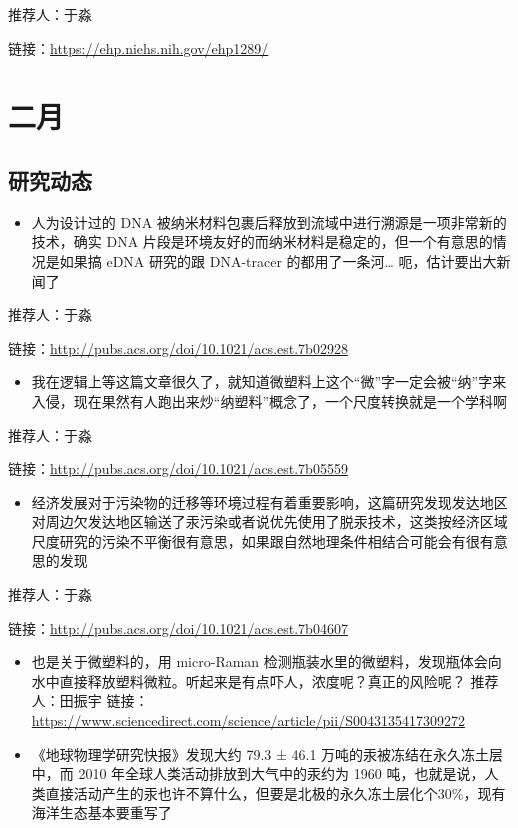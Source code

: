 \documentclass[
]{book}
\providecommand{\tightlist}{%
  \setlength{\itemsep}{0pt}\setlength{\parskip}{0pt}}
\begin{document}
推荐人：于淼

链接：\url{https://ehp.niehs.nih.gov/ehp1289/}

\hypertarget{ux4e8cux6708}{%
\section*{二月}\label{ux4e8cux6708}}

\hypertarget{ux7814ux7a76ux52a8ux6001-3}{%
\subsection*{研究动态}\label{ux7814ux7a76ux52a8ux6001-3}}

\begin{itemize}
\tightlist
\item
  人为设计过的 DNA 被纳米材料包裹后释放到流域中进行溯源是一项非常新的技术，确实 DNA 片段是环境友好的而纳米材料是稳定的，但一个有意思的情况是如果搞 eDNA 研究的跟 DNA-tracer 的都用了一条河\ldots{} 呃，估计要出大新闻了
\end{itemize}

推荐人：于淼

链接：\url{http://pubs.acs.org/doi/10.1021/acs.est.7b02928}

\begin{itemize}
\tightlist
\item
  我在逻辑上等这篇文章很久了，就知道微塑料上这个``微''字一定会被``纳''字来入侵，现在果然有人跑出来炒``纳塑料''概念了，一个尺度转换就是一个学科啊
\end{itemize}

推荐人：于淼

链接：\url{http://pubs.acs.org/doi/10.1021/acs.est.7b05559}

\begin{itemize}
\tightlist
\item
  经济发展对于污染物的迁移等环境过程有着重要影响，这篇研究发现发达地区对周边欠发达地区输送了汞污染或者说优先使用了脱汞技术，这类按经济区域尺度研究的污染不平衡很有意思，如果跟自然地理条件相结合可能会有很有意思的发现
\end{itemize}

推荐人：于淼

链接：\url{http://pubs.acs.org/doi/10.1021/acs.est.7b04607}

\begin{itemize}
\item
  也是关于微塑料的，用 micro-Raman 检测瓶装水里的微塑料，发现瓶体会向水中直接释放塑料微粒。听起来是有点吓人，浓度呢？真正的风险呢？
  推荐人：田振宇
  链接：\url{https://www.sciencedirect.com/science/article/pii/S0043135417309272}
\item
  《地球物理学研究快报》发现大约 79.3 ± 46.1 万吨的汞被冻结在永久冻土层中，而 2010 年全球人类活动排放到大气中的汞约为 1960 吨，也就是说，人类直接活动产生的汞也许不算什么，但要是北极的永久冻土层化个30\%，现有海洋生态基本要重写了
\end{itemize}
\end{document}

